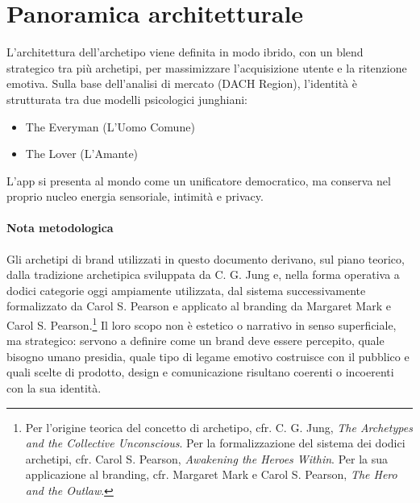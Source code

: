 \documentclass[a4paper, 11pt, table, dvipsnames]{article}
\begin{document}
\section{Panoramica architetturale}
L'architettura dell'archetipo viene definita in modo
ibrido, con un blend strategico tra più archetipi, per
massimizzare l'acquisizione utente e la ritenzione emotiva.
Sulla base dell'analisi di mercato (DACH Region), l'identità
è strutturata tra due modelli psicologici junghiani:
\begin{itemize}
      \item The Everyman (L'Uomo Comune)

      \item The Lover (L'Amante)
\end{itemize}
L'app si presenta al mondo come un unificatore democratico,
ma conserva nel proprio nucleo energia sensoriale, intimità
e privacy.

\paragraph{Nota metodologica}
Gli archetipi di brand utilizzati in questo documento
derivano, sul piano teorico, dalla tradizione archetipica
sviluppata da C. G. Jung e, nella forma operativa a dodici
categorie oggi ampiamente utilizzata, dal sistema
successivamente formalizzato da Carol S. Pearson e applicato
al branding da Margaret Mark e Carol S. Pearson.\footnote{Per
      l'origine teorica del concetto di archetipo, cfr. C. G.
      Jung, \textit{The Archetypes and the Collective
            Unconscious}. Per la formalizzazione del sistema dei dodici
      archetipi, cfr. Carol S. Pearson, \textit{Awakening the
            Heroes Within}. Per la sua applicazione al branding, cfr. Margaret
      Mark e Carol S. Pearson, \textit{The Hero and the Outlaw}.}
Il loro scopo non è estetico o narrativo in senso
superficiale, ma strategico: servono a definire come un
brand deve essere percepito, quale bisogno umano presidia,
quale tipo di legame emotivo costruisce con il pubblico e
quali scelte di prodotto, design e comunicazione risultano
coerenti o incoerenti con la sua identità.
\end{document}
